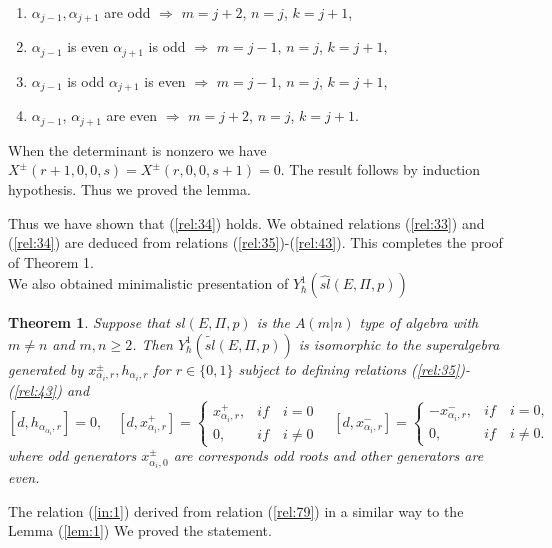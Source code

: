 \documentclass[english]{elsarticle}
\newtheorem{theorem}{Theorem}[section]
\numberwithin{equation}{section}
\begin{document}
\begin{enumerate}
    \item $\alpha_{j-1},\alpha_{j+1}$ are odd $\Rightarrow$ $m=j+2$, $n=j$, $k=j+1$,
    \item $\alpha_{j-1}$ is even $\alpha_{j+1}$ is odd $\Rightarrow$ $m=j-1$, $n=j$, $k=j+1$,
    \item $\alpha_{j-1}$ is odd $\alpha_{j+1}$ is even $\Rightarrow$ $m=j-1$, $n=j$, $k=j+1$,
    \item $\alpha_{j-1}$, $\alpha_{j+1}$ are even $\Rightarrow$ $m=j+2$, $n=j$, $k=j+1$.
\end{enumerate}
When the determinant is nonzero we have $X^{\pm}(r+1,0,0,s)=X^{\pm}(r,0,0,s+1)=0$. The result follows by induction hypothesis.
Thus we proved the lemma.


Thus we have shown that (\ref{rel:34}) holds. We obtained relations (\ref{rel:33}) and (\ref{rel:34}) are deduced from relations (\ref{rel:35})-(\ref{rel:43}). This completes the proof of Theorem 1.\\
We also obtained minimalistic presentation of $Y_{\hbar}^1(\hat{sl}(E,\Pi,p))$

\begin{theorem}
 Suppose that $sl(E,\Pi,p)$ is the $A(m|n)$ type of algebra with $m\neq n$ and $m,n \geq 2$. Then $Y_{\hbar}^1(\tilde{sl}(E,\Pi,p))$ is isomorphic to the superalgebra generated by $x_{\alpha_i,r}^{\pm}, h_{\alpha_i,r}$ for $r \in \{0,1\}$ subject to defining relations (\ref{rel:35})-(\ref{rel:43}) and
\begin{equation}
\label{rel:79}
    [d,h_{\alpha_{\alpha_i},r}]=0,\quad  [d, x_{\alpha_i,r}^{+}]=
    \begin{cases}
    x_{\alpha_i,r}^{+}, & if \quad i=0\\
    0, & if \quad i \neq 0
    \end{cases}
    \quad
    [d,x_{\alpha_i,r}^{-}]=
    \begin{cases}
    - x_{\alpha_i,r}^{-}, & if \quad i=0,\\
    0, & if \quad i \neq 0.
    \end{cases}
\end{equation}
where odd generators $x_{\alpha_i,0}^{\pm}$ are corresponds odd roots and other generators are even.\\
\end{theorem}

The relation (\ref{in:1}) derived from relation (\ref{rel:79}) in a similar way to the Lemma (\ref{lem:1}) We proved the statement.
\end{document}
